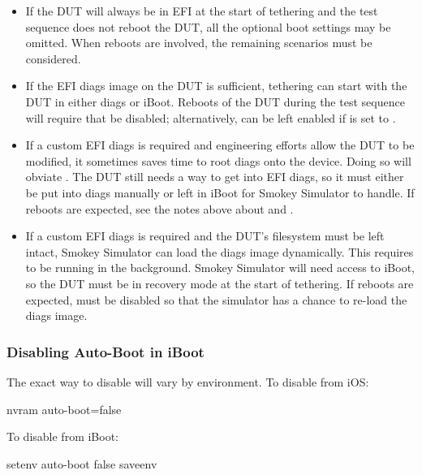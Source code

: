 \begin{itemize}

\item If the DUT will always be in EFI at the start of tethering and the test
sequence does not reboot the DUT, all the optional boot settings may be
omitted.  When reboots are involved, the remaining scenarios must be
considered.

\item If the EFI diags image on the DUT is sufficient, tethering can start
with the DUT in either diags or iBoot.  Reboots of the DUT during the test
sequence will require that  be disabled; alternatively,
 can be left enabled if  is set to
.

\item If a custom EFI diags is required and engineering efforts allow the DUT
to be modified, it sometimes saves time to root diags onto the device.  Doing
so will obviate .  The DUT still needs a way to get into EFI
diags, so it must either be put into diags manually or left in iBoot for
Smokey Simulator to handle.  If reboots are expected, see the notes above
about  and .

\item If a custom EFI diags is required and the DUT's filesystem must be left
intact, Smokey Simulator can load the diags image dynamically.  This requires
 to be running in the background.  Smokey Simulator will need
access to iBoot, so the DUT must be in recovery mode at the start of
tethering.  If reboots are expected,  must be disabled so
that the simulator has a chance to re-load the diags image.

\end{itemize}

\subsubsection{Disabling Auto-Boot in iBoot}

The exact way to disable  will vary by environment.  To
disable from iOS: 

\begin{CommandLine}
nvram auto-boot=false
\end{CommandLine}

To disable  from iBoot: 

\begin{CommandLine}
setenv auto-boot false
saveenv
\end{CommandLine}

